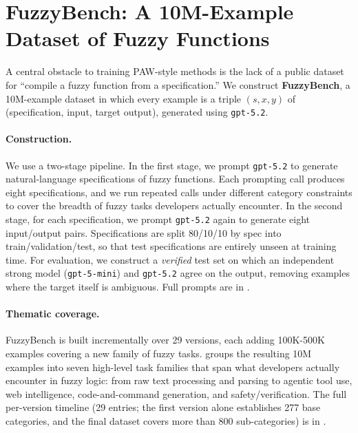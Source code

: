 \documentclass{article}
\theoremstyle{plain}
\theoremstyle{definition}
\theoremstyle{remark}
\begin{document}

\section{FuzzyBench: A 10M-Example Dataset of Fuzzy Functions}
\label{sec:fuzzybench}

A central obstacle to training PAW-style methods is the lack of a public dataset for ``compile a fuzzy function from a specification.'' We construct \textbf{FuzzyBench}, a 10M-example dataset in which every example is a triple $(s, x, y)$ of (specification, input, target output), generated using \texttt{gpt-5.2}.

\paragraph{Construction.}
We use a two-stage pipeline. In the first stage, we prompt \texttt{gpt-5.2} to generate natural-language specifications of fuzzy functions. Each prompting call produces eight specifications, and we run repeated calls under different category constraints to cover the breadth of fuzzy tasks developers actually encounter. In the second stage, for each specification, we prompt \texttt{gpt-5.2} again to generate eight input/output pairs. Specifications are split 80/10/10 by spec into train/validation/test, so that test specifications are entirely unseen at training time. For evaluation, we construct a \emph{verified} test set on which an independent strong model (\texttt{gpt-5-mini}) and \texttt{gpt-5.2} agree on the output, removing examples where the target itself is ambiguous. Full prompts are in .

\paragraph{Thematic coverage.}
FuzzyBench is built incrementally over 29 versions, each adding 100K-500K examples covering a new family of fuzzy tasks.  groups the resulting 10M examples into seven high-level task families that span what developers actually encounter in fuzzy logic: from raw text processing and parsing to agentic tool use, web intelligence, code-and-command generation, and safety/verification. The full per-version timeline (29 entries; the first version alone establishes 277 base categories, and the final dataset covers more than 800 sub-categories) is in .
\end{document}
